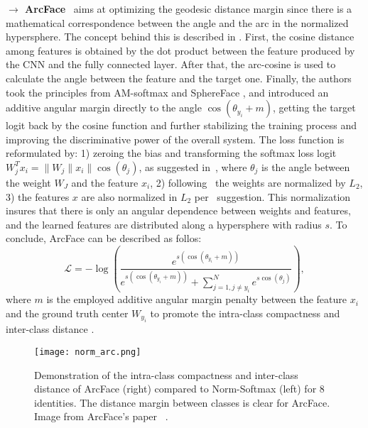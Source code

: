 \documentclass[class=report, crop=false, a4paper, 12pt]{standalone}
\begin{document}
\noindent\textbf{$\rightarrow$ ArcFace}~\autocite{dengArcFaceAdditiveAngular} aims at optimizing the geodesic distance margin since there is a mathematical correspondence between the angle and the arc in the normalized hypersphere. The concept behind this is described in . First, the cosine distance among features is obtained by the dot product between the feature produced by the CNN and the fully connected layer. After that, the arc-cosine is used to calculate the angle between the feature and the target one. Finally, the authors took the principles from AM-softmax \autocite{wangAdditiveMarginSoftmax2018} and SphereFace \autocite{liuSphereFaceDeepHypersphere2018}, and introduced an additive angular margin directly to the angle $\cos{(\theta_{y_i}+m)}$, getting the target logit back by the cosine function and further stabilizing the training process and improving the discriminative power of the overall system. The loss function is reformulated by: 1) zeroing the bias and transforming the softmax loss logit $W^{T}_{j}x_i=\|W_j\|x_i\|\cos{(\theta_j)}$, as suggested in~\autocite{liuSphereFaceDeepHypersphere2018}, where $\theta_j$ is the angle between the weight $W_J$ and the feature $x_i$, 2) following~\autocite{wangNormFaceL2Hypersphere2017,liuSphereFaceDeepHypersphere2018,wangCosFaceLargeMargin2018} the weights are normalized by $L_2$, 3) the features $x$ are also normalized in $L_2$ per~\autocite{ranjanL2constrainedSoftmaxLoss2017,wangNormFaceL2Hypersphere2017,wangAdditiveMarginSoftmax2018,wangCosFaceLargeMargin2018} suggestion. This normalization insures that there is only an angular dependence between weights and features, and the learned features are distributed along a hypersphere with radius $s$. To conclude, ArcFace can be described as follos:
\begin{equation}
\mathcal{L}=-\log\left(
                \frac{e^{s(\cos{(\theta_{y_i}+m)})}}
                {e^{s(\cos{(\theta_{y_i}+m)})} + \sum_{j=1, j\neq y_i}^{N}e^{s \cos{(\theta_j)}}}
            \right),
\end{equation}
\noindent where $m$ is the employed additive angular margin penalty between the feature $x_i$ and the ground truth center $W_{y_i}$ to promote the intra-class compactness and inter-class distance .

\begin{figure}[H]
    \centering
    \texttt{[image: norm\_arc.png]}
    \caption{Demonstration of the intra-class compactness and inter-class distance of ArcFace (right) compared to Norm-Softmax (left) for 8 identities. The distance margin between classes is clear for ArcFace. Image from ArcFace's paper ~\autocite{dengArcFaceAdditiveAngular}.}
    \label{fig:norm_arcface}
\end{figure}
\end{document}
